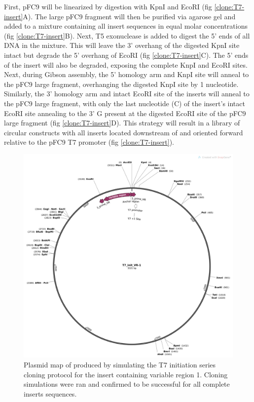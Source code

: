 \documentclass[11pt]{article}
\begin{document}
First, pFC9 will be linearized by digestion with KpnI and EcoRI  (fig \ref{clone:T7-insert}A). The large pFC9 fragment will then be purified via agarose gel and added to a mixture containing all insert sequences in equal molar concentrations (fig \ref{clone:T7-insert}B). Next, T5 exonuclease is added to digest the 5' ends of all DNA in the mixture. This will leave the 3' overhang of the digested KpnI site intact but degrade the 5' overhang of EcoRI  (fig \ref{clone:T7-insert}C). The 5' ends of the insert will also be degraded, exposing the complete KnpI and EcoRI sites. Next, during Gibson assembly, the 5' homology arm and KnpI site will anneal to the pFC9 large fragment, overhanging the digested KnpI site by 1 nucleotide. Similarly, the 3' homology arm and intact EcoRI site of the inserts will anneal to the pFC9 large fragment, with only the last nucleotide (C) of the insert's intact EcoRI site annealing to the 3' G present at the digested EcoRI site of the pFC9 large fragment (fig \ref{clone:T7-insert}D). This strategy will result in a library of circular constructs with all inserts located downstream of and oriented forward relative to the pFC9 T7 promoter (fig \ref{clone:T7-insert}). 

\begin{figure}[H]
	\includegraphics[width=12cm]{images/plasmid_maps/T7_init_vr-1_simulated_assembly.png}
	\centering
	\caption{Plasmid map of produced by simulating the T7 initiation series cloning protocol for the insert containing variable region 1. Cloning simulations were ran and confirmed to be successful for all complete inserts sequences.}
	\label{clone:T7-insert-simulated}
\end{figure}
\end{document}
